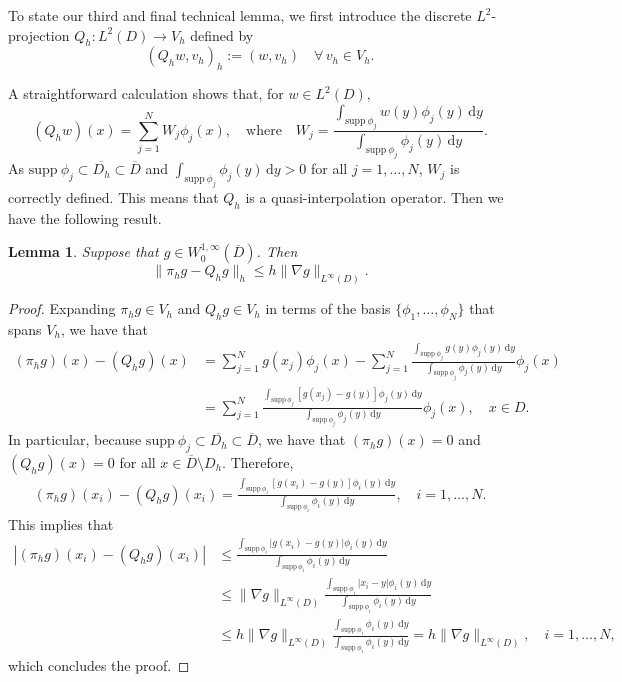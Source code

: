 \documentclass[12pt]{article}
\newtheorem{lemma}{Lemma}[section]
\newcommand{\dd}{\,\mathrm{d}}
\begin{document}
{  

To state our third and final technical lemma, we first introduce the discrete $L^2$-projection $Q_h: L^2(D) \to V_h$ defined by
%
\begin{equation}\label{mixed-L2-proj}
    (Q_h w, v_h)_h := (w, v_h) \quad \forall\,  v_h \in V_h.
\end{equation}
%

A straightforward calculation shows that, for $w \in L^2(D)$, 
%
\[ (Q_h w)(x) = \sum_{j=1}^N W_j \phi_j(x), \quad \mbox{where} \quad 
W_j= \frac{\int_{\mathrm{supp}~\!\!\phi_j} w(y) \phi_j(y) \dd y}{\int_{\mathrm{supp}~\!\!\phi_j} \phi_j(y)\dd y}.\]
%
As $\mathrm{supp}~\!\phi_j \subset \overline{D_h}\subset \overline{D}$ and $\int_{\mathrm{supp}~\!\phi_j} \phi_j(y) \dd y >0$ for all $j=1,\ldots,N$, $W_j$ is correctly defined. This means that $Q_h$ is a quasi-interpolation operator. Then we have the following result. 
%
\begin{lemma}\label{lemma:g}
Suppose that $g \in W^{1,\infty}_0(\overline{D})$.  Then
\begin{equation}
\label{eq:lemmag}
 \| \pi_h g - Q_hg \|_h \leq  h \|\nabla g\|_{L^\infty(D)}.
 \end{equation}
\end{lemma}

\begin{proof} 
Expanding $\pi_h g \in V_h$ and $Q_h g \in V_h$ in terms of the basis $\{\phi_1,\ldots, \phi_N\}$ that spans $V_h$, we have that 
%
\begin{align*}
(\pi_h g) (x) - (Q_hg)(x) &= \sum_{j=1}^N g(x_j)\phi_j(x) - \sum_{j=1}^N \frac{\int_{\mathrm{supp}~\!\!\phi_j} g(y) \phi_j(y) \dd y}{\int_{\mathrm{supp}~\!\!\phi_j} \phi_j(y)\dd y} \phi_j(x)\\
&= \sum_{j=1}^N \frac{\int_{\mathrm{supp}~\!\!\phi_j} [g(x_j) - g(y)] \phi_j(y) \dd y}{\int_{\mathrm{supp}~\!\!\phi_j} \phi_j(y)\dd y} \phi_j(x),\quad x \in D.
\end{align*}
%
In particular, because $\mathrm{supp}~\!\phi_j \subset \overline{D_h}\subset \overline{D}$, we have that 
$(\pi_h g) (x) =0 $ and $ (Q_hg)(x) =0$ for all $x \in \overline{D}\setminus D_h$.
Therefore, 
\begin{align*}
(\pi_h g) (x_i) - (Q_hg)(x_i) = \frac{\int_{\mathrm{supp}~\!\!\phi_i} [g(x_i) - g(y)] \phi_i(y) \dd y}{\int_{\mathrm{supp}~\!\!\phi_i} \phi_i(y)\dd y}, \quad i=1,\ldots, N.
\end{align*}
%
This implies that 
%
\begin{align*}
|(\pi_h g) (x_i) - (Q_hg)(x_i)| & \leq  \frac{\int_{\mathrm{supp}~\!\!\phi_i} |g(x_i) - g(y)| \phi_i(y) \dd y}{\int_{\mathrm{supp}~\!\!\phi_i} \phi_i(y)\dd y}\\
&\leq \|\nabla g\|_{L^\infty(D)} \frac{\int_{\mathrm{supp}~\!\!\phi_i} |x_i - y| \phi_i(y) \dd y}{\int_{\mathrm{supp}~\!\!\phi_i} \phi_i(y)\dd y}\\ 
&\leq h \|\nabla g\|_{L^\infty(D)}\frac{\int_{\mathrm{supp}~\!\!\phi_i} \phi_i(y) \dd y}{\int_{\mathrm{supp}~\!\!\phi_i} \phi_i(y)\dd y} =  h \|\nabla g\|_{L^\infty(D)}, \quad i=1,\ldots,N,
\end{align*}
which concludes the proof. 
\end{proof}

}
\end{document}
